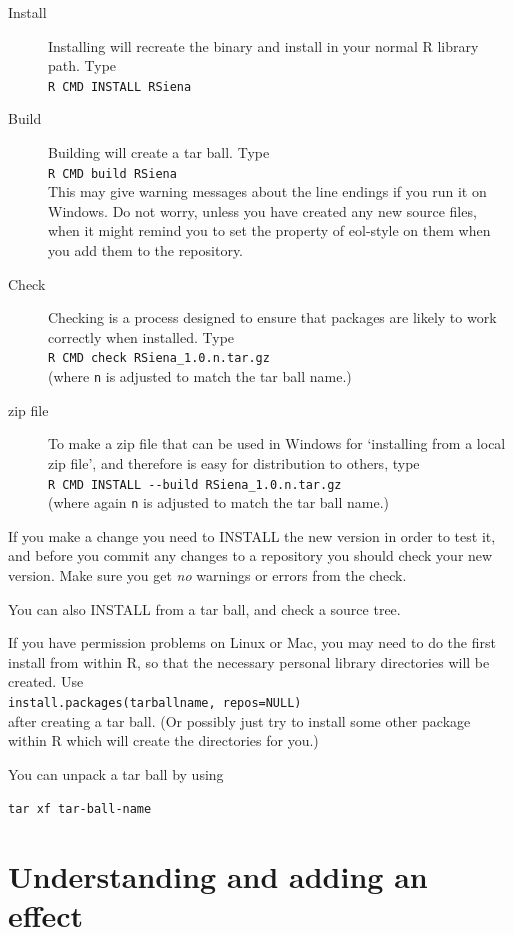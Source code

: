 \documentclass[a4paper,fleqn,11pt]{article}
\newcommand{\+}{\, + \,}
\begin{document}
{\begin{description}
\item[Install] Installing will recreate the binary and install in your normal R
  library path. Type\\
\verb|R CMD INSTALL RSiena|
\item[Build] Building will create a tar ball. Type\\
\verb|R CMD build RSiena|\\
This may give warning messages about the line endings if you run it on
Windows. Do not worry, unless you have created any new source files, when it
might remind you to set the property of \textsf{eol-style} on them when you add
them to the repository.
\item [Check] Checking is a process designed to ensure that packages are likely
  to work correctly when installed. Type\\
\verb|R CMD check RSiena_1.0.n.tar.gz|\\
(where \verb|n| is adjusted to match the tar ball name.)
\item[zip file] To make a zip file that can be used in Windows for
`installing from a local zip file', and therefore is easy for distribution
to others, type\\
\verb|R CMD INSTALL --build RSiena_1.0.n.tar.gz| \\
(where again \verb|n| is adjusted to match the tar ball name.)
\end{description}

If you make a change you need to \textsf{INSTALL} the new version in order to
test it, and before you commit any changes to a repository you should
\textsf{check} your new version. Make sure you get \emph{no} warnings or
errors from the check.

You can also \textsf{INSTALL} from a tar ball, and \textsf{check} a source
tree.

If you have permission problems on Linux or Mac, you may need to do the first
install from within \textsf{R}, so that the necessary personal library
directories will be created. Use\\
\verb|install.packages(tarballname, repos=NULL)| \\after creating a tar
ball. (Or possibly just try to install some other package within R which will
create the directories for you.)

You can unpack a tar ball by using

\verb|tar xf tar-ball-name|

\section{Understanding and adding an effect}

}
\end{document}
